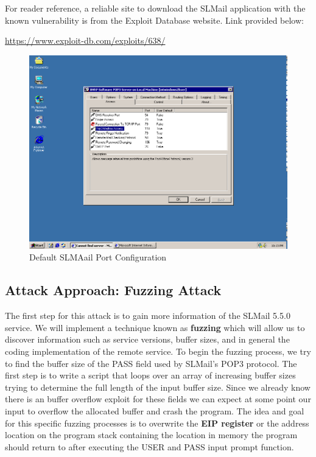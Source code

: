 \documentclass[12pt]{article}
\begin{document}
For reader reference, a reliable site to download the SLMail application 
with the known vulnerability is from the Exploit Database website. Link
provided below:

\url{https://www.exploit-db.com/exploits/638/}

\begin{figure}[ht]
    \centering
    \includegraphics[width=5.5in]{images/20160407_slmail_config.png}
    \caption{Default SLMAail Port Configuration}
    \label{fig:deafconfigslmail}
\end{figure}

\subsection{Attack Approach: Fuzzing Attack}
\label{sec:approachpassbuff}

The first step for this attack is to gain more information of the
SLMail 5.5.0 service. We will implement a technique known as \textbf{fuzzing}
which will allow us to discover information such as service versions, 
buffer sizes, and in general the coding implementation of the remote
service. To begin the fuzzing process, we try to find the buffer size of the 
PASS field used by SLMail's POP3 protocol. The first step is to write a 
script that loops over an array of increasing buffer sizes trying to 
determine the full length of the input buffer size. Since we already know 
there is an buffer overflow exploit for these fields we can expect at some 
point our input to overflow the allocated buffer and crash the program. 
The idea and goal for this specific fuzzing processes is to overwrite the 
\textbf{EIP register} or the address location on the program stack 
containing the location in memory the program should return to after 
executing the USER and PASS input prompt function.
\end{document}
